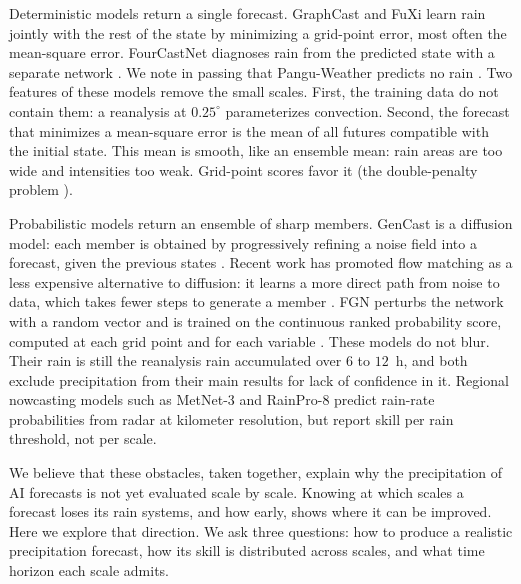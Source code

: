 \documentclass[draft]{agujournal2019}
\begin{document}
Deterministic models return a single forecast. GraphCast and FuXi learn
rain jointly with the rest of the state by minimizing a grid-point error,
most often the mean-square error. FourCastNet diagnoses rain from the
predicted state with a separate network \cite{pathak2022}. We note in
passing that Pangu-Weather predicts no rain \cite{bi2023}. Two features of
these models remove the small scales. First, the training data do not
contain them: a reanalysis at $0.25^{\circ}$ parameterizes convection.
Second, the forecast that minimizes a mean-square error is the mean of all
futures compatible with the initial state. This mean is smooth, like an
ensemble mean: rain areas are too wide and intensities too weak. Grid-point
scores favor it (the double-penalty problem \cite{ravuri2021}).

Probabilistic models return an ensemble of sharp members. GenCast is a
diffusion model: each member is obtained by progressively refining a noise
field into a forecast, given the previous states \cite{price2025}. Recent
work has promoted flow matching as a less expensive alternative to
diffusion: it learns a more direct path from noise to data, which takes
fewer steps to generate a member \cite{lipman2023, liu2023}. FGN
perturbs the network with a random vector and is trained on the continuous
ranked probability score, computed at each grid point and for each variable
\cite{alet2025}. These models do not blur. Their rain is still the
reanalysis rain accumulated over $6$ to $12$~h, and both exclude
precipitation from their main results for lack of confidence in it.
Regional nowcasting models such as MetNet-3 \cite{andrychowicz2023} and
RainPro-8 \cite{sarabia2025} predict rain-rate probabilities from radar at
kilometer resolution, but report skill per rain threshold, not per scale.

We believe that these obstacles, taken together, explain why the
precipitation of AI forecasts is not yet evaluated scale by scale. Knowing
at which scales a forecast loses its rain systems, and how early, shows
where it can be improved. Here we explore that direction. We ask three
questions: how to produce a realistic precipitation forecast, how its skill
is distributed across scales, and what time horizon each scale admits.
\end{document}

